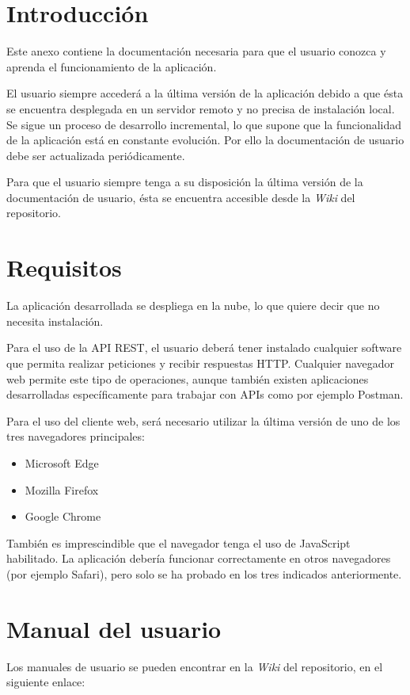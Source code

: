 
\section{Introducción}

Este anexo contiene la documentación necesaria para que el usuario conozca y aprenda el funcionamiento de la aplicación.

El usuario siempre accederá a la última versión de la aplicación debido a que ésta se encuentra desplegada en un servidor remoto y no precisa de instalación local. Se sigue un proceso de desarrollo incremental, lo que supone que la funcionalidad de la aplicación está en constante evolución. Por ello la documentación de usuario debe ser actualizada periódicamente.

Para que el usuario siempre tenga a su disposición la última versión de la documentación de usuario, ésta se encuentra accesible desde la \textit{Wiki} del repositorio.

\section{Requisitos}

La aplicación desarrollada se despliega en la nube, lo que quiere decir que no necesita instalación.

Para el uso de la API REST, el usuario deberá tener instalado cualquier software que permita realizar peticiones y recibir respuestas HTTP. Cualquier navegador web permite este tipo de operaciones, aunque también existen aplicaciones desarrolladas específicamente para trabajar con APIs como por ejemplo Postman.

Para el uso del cliente web, será necesario utilizar la última versión de uno de los tres navegadores principales:

\begin{itemize}
	\item{Microsoft Edge}
	\item{Mozilla Firefox}
	\item{Google Chrome}
\end{itemize}

También es imprescindible que el navegador tenga el uso de JavaScript habilitado. La aplicación debería funcionar correctamente en otros navegadores (por ejemplo Safari), pero solo se ha probado en los tres indicados anteriormente.

\section{Manual del usuario}

Los manuales de usuario se pueden encontrar en la \textit{Wiki} del repositorio, en el siguiente enlace:



